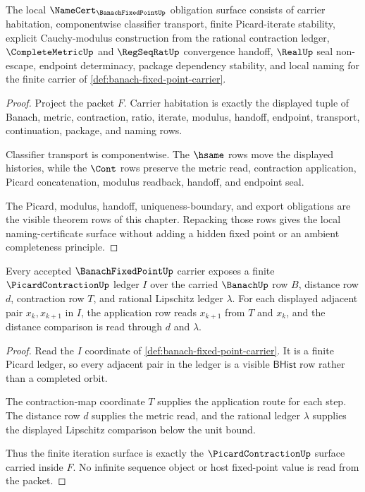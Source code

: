 \begin{theorem}
\label{thm:banach-fixed-point-namecert-obligations}
The local $\NameCert_{\BanachFixedPointUp}$ obligation surface consists of carrier habitation, componentwise classifier transport, finite Picard-iterate stability, explicit Cauchy-modulus construction from the rational contraction ledger, $\CompleteMetricUp$ and $\RegSeqRatUp$ convergence handoff, $\RealUp$ seal non-escape, endpoint determinacy, package dependency stability, and local naming for the finite carrier of \autoref{def:banach-fixed-point-carrier}.
\end{theorem}
\begin{proof}
Project the packet $F$. Carrier habitation is exactly the displayed tuple of Banach, metric, contraction, ratio, iterate, modulus, handoff, endpoint, transport, continuation, package, and naming rows.

Classifier transport is componentwise. The $\hsame$ rows move the displayed histories, while the $\Cont$ rows preserve the metric read, contraction application, Picard concatenation, modulus readback, handoff, and endpoint seal.

The Picard, modulus, handoff, uniqueness-boundary, and export obligations are the visible theorem rows of this chapter. Repacking those rows gives the local naming-certificate surface without adding a hidden fixed point or an ambient completeness principle.
\end{proof}

\begin{theorem}
\label{thm:banach-fixed-point-iteration-ledger}
Every accepted $\BanachFixedPointUp$ carrier exposes a finite $\PicardContractionUp$ ledger $I$ over the carried $\BanachUp$ row $B$, distance row $d$, contraction row $T$, and rational Lipschitz ledger $\lambda$. For each displayed adjacent pair $x_k,x_{k+1}$ in $I$, the application row reads $x_{k+1}$ from $T$ and $x_k$, and the distance comparison is read through $d$ and $\lambda$.
\end{theorem}
\begin{proof}
Read the $I$ coordinate of \autoref{def:banach-fixed-point-carrier}. It is a finite Picard ledger, so every adjacent pair in the ledger is a visible $\mathsf{BHist}$ row rather than a completed orbit.

The contraction-map coordinate $T$ supplies the application route for each step. The distance row $d$ supplies the metric read, and the rational ledger $\lambda$ supplies the displayed Lipschitz comparison below the unit bound.

Thus the finite iteration surface is exactly the $\PicardContractionUp$ surface carried inside $F$. No infinite sequence object or host fixed-point value is read from the packet.
\end{proof}

